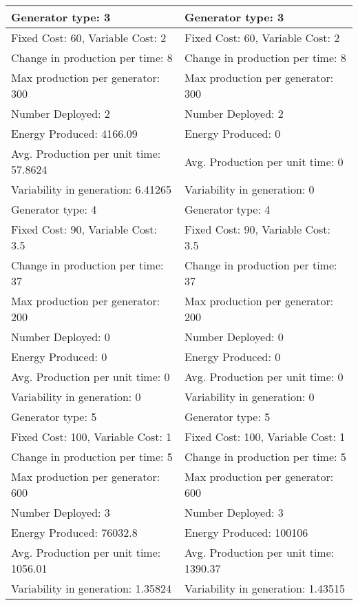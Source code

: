 \begin{longtable}{ |  l  |  l  | }
\hline
Generator type: 3			&	Generator type: 3	\\
\hline
Fixed Cost: 60, Variable Cost: 2	&	Fixed Cost: 60, Variable Cost: 2	\\
Change in production per time: 8	&	Change in production per time: 8	\\
Max production per generator: 300	&	Max production per generator: 300	\\
Number Deployed: 2			&	Number Deployed: 2			\\
Energy Produced: 4166.09		&	Energy Produced: 0	\\
Avg. Production per unit time: 57.8624&	Avg. Production per unit time: 0	\\
Variability in generation: 6.41265	&	Variability in generation: 0	\\

\hline
Generator type: 4			&	Generator type: 4	\\
Fixed Cost: 90, Variable Cost: 3.5 	&	Fixed Cost: 90, Variable Cost: 3.5	\\
Change in production per time: 37	&	Change in production per time: 37	\\
Max production per generator: 200	&	Max production per generator: 200	\\
Number Deployed: 0			&	Number Deployed: 0	\\
Energy Produced: 0			&	Energy Produced: 0	\\
Avg. Production per unit time: 0	&	Avg. Production per unit time: 0	\\
Variability in generation: 0		&	Variability in generation: 0	\\

\hline
Generator type: 5			&	Generator type: 5	\\
\hline
Fixed Cost: 100, Variable Cost: 1	&	Fixed Cost: 100, Variable Cost: 1	\\
Change in production per time: 5	&	Change in production per time: 5	\\
Max production per generator: 600	&	Max production per generator: 600	\\
Number Deployed: 3			&	Number Deployed: 3			\\
Energy Produced: 76032.8		&	Energy Produced: 100106		\\
Avg. Production per unit time: 1056.01&	Avg. Production per unit time: 1390.37	\\
Variability in generation: 1.35824	&	Variability in generation: 1.43515	\\


\end{longtable}
